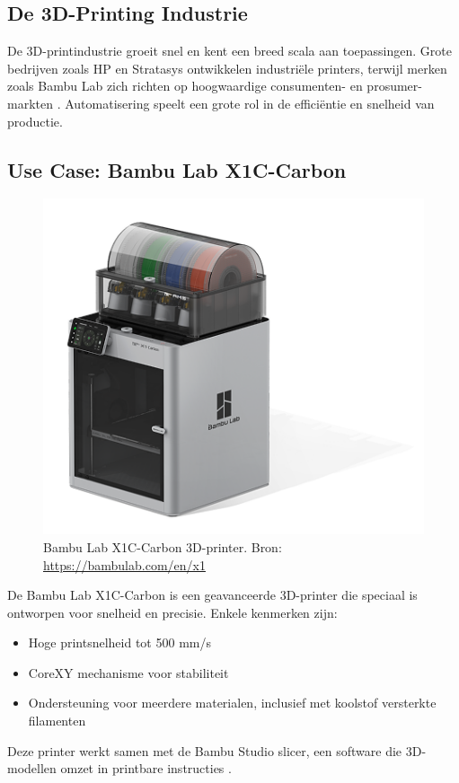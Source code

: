\newpage
\subsection{De 3D-Printing Industrie}
De 3D-printindustrie groeit snel en kent een breed scala aan toepassingen. Grote bedrijven zoals HP en Stratasys ontwikkelen industriële printers, terwijl merken zoals Bambu Lab zich richten op hoogwaardige consumenten- en prosumer-markten \autocite{3dPrintingIndustry}. Automatisering speelt een grote rol in de efficiëntie en snelheid van productie.

\subsection{Use Case: Bambu Lab X1C-Carbon}
\begin{figure} %
    \centering
    \includegraphics[width=0.8\linewidth]{Foto's/X1C}
    \caption{Bambu Lab X1C-Carbon 3D-printer. Bron: \url{https://bambulab.com/en/x1}}
    \label{fig:x1c}
\end{figure}
De Bambu Lab X1C-Carbon is een geavanceerde 3D-printer die speciaal is ontworpen voor snelheid en precisie. Enkele kenmerken zijn:
\begin{itemize}
    \item Hoge printsnelheid tot 500 mm/s
    \item CoreXY mechanisme voor stabiliteit
    \item Ondersteuning voor meerdere materialen, inclusief met koolstof versterkte filamenten
\end{itemize}
Deze printer werkt samen met de Bambu Studio slicer, een software die 3D-modellen omzet in printbare instructies \autocite{bambulabX1Carbon}.



